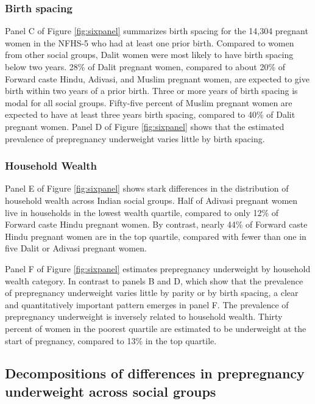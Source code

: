 \documentclass[12pt]{article}
\begin{document}
\subsubsection*{Birth spacing}

Panel C of Figure \ref{fig:sixpanel} summarizes birth spacing for the 14,304 pregnant women in the NFHS-5 who had at least one prior birth.  Compared to women from other social groups, Dalit women were most likely to have birth spacing below two years.  28\% of Dalit pregnant women, compared to about 20\% of Forward caste Hindu, Adivasi, and Muslim pregnant women, are expected to give birth within two years of a prior birth.  Three or more years of birth spacing is modal for all social groups.  Fifty-five percent of Muslim pregnant women are expected to have at least three years birth spacing, compared to 40\% of Dalit pregnant women. Panel D of Figure \ref{fig:sixpanel} shows that the estimated prevalence of prepregnancy underweight varies little by birth spacing.

\subsubsection*{Household Wealth}

Panel E of Figure \ref{fig:sixpanel} shows stark differences in the distribution of household wealth across Indian social groups. Half of Adivasi pregnant women live in households in the lowest wealth quartile, compared to only 12\% of Forward caste Hindu pregnant women. By contrast, nearly 44\% of Forward caste Hindu pregnant women are in the top quartile, compared with fewer than one in five Dalit or Adivasi pregnant women. 

Panel F of Figure \ref{fig:sixpanel} estimates prepregnancy underweight by household wealth category.  In contrast to panels B and D, which show that the prevalence of prepregnancy underweight varies little by parity or by birth spacing, a clear and quantitatively important pattern emerges in panel F.  The prevalence of prepregnancy underweight is inversely related to household wealth.  Thirty percent of women in the poorest quartile are estimated to be underweight at the start of pregnancy, compared to 13\% in the top quartile.  

\subsection*{Decompositions of differences in prepregnancy underweight across social groups}\label{sec:kitagawa}
\end{document}
